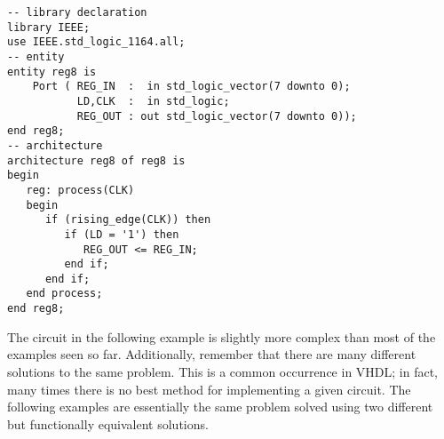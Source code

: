 \noindent
\begin{minipage}{0.99\linewidth}
\begin{lstlisting}[label=ex23_code, caption=Solution to Example~23.]
-- library declaration
library IEEE;
use IEEE.std_logic_1164.all;
-- entity
entity reg8 is
    Port ( REG_IN  :  in std_logic_vector(7 downto 0);
           LD,CLK  :  in std_logic;
           REG_OUT : out std_logic_vector(7 downto 0));
end reg8;
-- architecture
architecture reg8 of reg8 is
begin
   reg: process(CLK)
   begin
      if (rising_edge(CLK)) then
         if (LD = '1') then
            REG_OUT <= REG_IN;
         end if;
      end if;
   end process;
end reg8;
\end{lstlisting}
\end{minipage}

The circuit in the following example is slightly more complex than most of the examples seen so far. Additionally, remember that there are many different solutions to the same problem. This is a common occurrence in VHDL; in fact, many times there is no best method for implementing a given circuit. The following examples are essentially the same problem solved using two different but functionally equivalent solutions.

